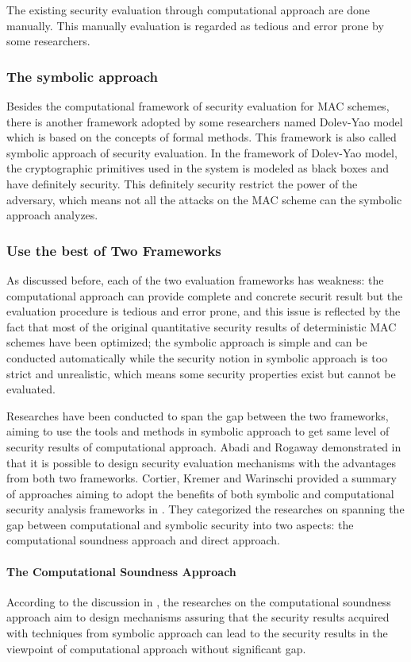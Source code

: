\documentclass{article}
\begin{document}
The existing security evaluation through computational approach are done manually. This manually evaluation is regarded as tedious and error prone by some researchers. 
\subsubsection{The symbolic approach}
Besides the computational framework of security evaluation for MAC schemes, there is another framework adopted by some researchers named Dolev-Yao model which is based on the concepts of formal methods. This framework is also called symbolic approach of security evaluation.
In the framework of Dolev-Yao model, the cryptographic primitives used in the system is modeled as black boxes and have definitely security. 
This definitely security restrict the power of the adversary, which means not all the attacks on the MAC scheme can the symbolic approach analyzes.  

\subsubsection{Use the best of Two Frameworks}
As discussed before, each of the two evaluation frameworks has weakness: the computational approach can provide complete and concrete securit result but the evaluation procedure is tedious and error prone, and this issue is reflected by the fact that most of the original quantitative security results of deterministic MAC schemes have been optimized; the symbolic approach is simple and can be conducted automatically while the security notion in symbolic approach is too strict and unrealistic, which means some security properties exist but cannot be evaluated. 

Researches have been conducted to span the gap between the two frameworks, aiming to use the tools and methods in symbolic approach to get same level of security results of computational approach. Abadi and Rogaway demonstrated in \cite{abadi_rogaway} that it is possible to design security evaluation mechanisms with the advantages from both two frameworks. 
Cortier, Kremer and Warinschi provided a summary of approaches aiming to adopt the benefits of both symbolic and computational security analysis frameworks in \cite{survey}. They categorized the researches on spanning the gap between computational and symbolic security into two aspects: the computational soundness approach and direct approach.
\paragraph{The Computational Soundness Approach}
According to the discussion in \cite{survey}, the researches on the computational soundness approach aim to design mechanisms assuring that the security results acquired with techniques from symbolic approach can lead to the security results in the viewpoint of computational approach without significant gap.
\end{document}
